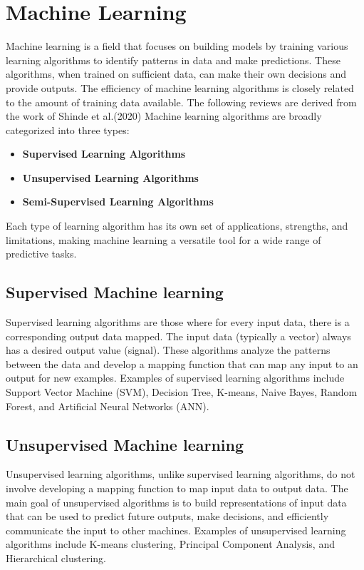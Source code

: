\documentclass{book}
\numberwithin{equation}{section}
\numberwithin{figure}{section}
\begin{document}
\section{Machine Learning}
\label{machine learning}
\vspace{-5mm} %
Machine learning is a field that focuses on building models by training various learning algorithms to identify patterns in data and make predictions. These algorithms, when trained on sufficient data, can make their own decisions and provide outputs. The efficiency of machine learning algorithms is closely related to the amount of training data available. The following reviews are derived from the work of Shinde et al.(2020) \cite{shinde2020}
Machine learning algorithms are broadly categorized into three types:
\begin{itemize}
    \item \textbf{Supervised Learning Algorithms}
    \item \textbf{Unsupervised Learning Algorithms}
    \item \textbf{Semi-Supervised Learning Algorithms}
\end{itemize}
Each type of learning algorithm has its own set of applications, strengths, and limitations, making machine learning a versatile tool for a wide range of predictive tasks.
\subsection{Supervised Machine learning}
\label{supervised}
\vspace{-5mm} %
Supervised learning algorithms are those where for every input data, there is a corresponding output data mapped. The input data (typically a vector) always has a desired output value (signal). These algorithms analyze the patterns between the data and develop a mapping function that can map any input to an output for new examples. Examples of supervised learning algorithms include Support Vector Machine (SVM), Decision Tree, K-means, Naive Bayes, Random Forest, and Artificial Neural Networks (ANN).
\vspace{-5mm} %
\subsection{Unsupervised Machine learning}
\label{unsupervised}
\vspace{-5mm} %
Unsupervised learning algorithms, unlike supervised learning algorithms, do not involve developing a mapping function to map input data to output data. The main goal of unsupervised algorithms is to build representations of input data that can be used to predict future outputs, make decisions, and efficiently communicate the input to other machines. Examples of unsupervised learning algorithms include K-means clustering, Principal Component Analysis, and Hierarchical clustering.
\end{document}
